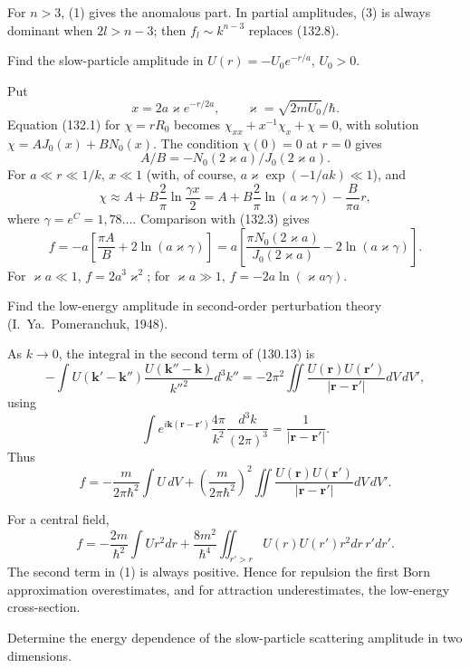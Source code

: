 For $n>3$, (1) gives the anomalous part. In partial amplitudes, (3) is always
dominant when $2l>n-3$; then $f_l\sim k^{n-3}$ replaces (132.8).

 Find the slow-particle amplitude in
$U(r)=-U_0e^{-r/a}$, $U_0>0$.

\SolutionHeading Put
\[
 x=2a\varkappa e^{-r/2a},\qquad \varkappa=\sqrt{2mU_0}/\hbar.
\]
Equation (132.1) for $\chi=rR_0$ becomes
$\chi_{xx}+x^{-1}\chi_x+\chi=0$, with solution
$\chi=AJ_0(x)+BN_0(x)$. The condition $\chi(0)=0$ at $r=0$ gives
\[
 A/B=-N_0(2\varkappa a)/J_0(2\varkappa a).
\]
For $a\ll r\ll1/k$, $x\ll1$ (with, of course,
$a\varkappa\exp(-1/ak)\ll1$), and
\[
 \chi\approx A+B\frac2\pi\ln\frac{\gamma x}2
 =A+B\frac2\pi\ln(a\varkappa\gamma)-\frac B{\pi a}r,
\]
where $\gamma=e^C=1{,}78\ldots$. Comparison with (132.3) gives
\[
 f=-a\left[\frac{\pi A}{B}+2\ln(a\varkappa\gamma)\right]
 =a\left[\frac{\pi N_0(2\varkappa a)}{J_0(2\varkappa a)}
 -2\ln(a\varkappa\gamma)\right].
\]
For $\varkappa a\ll1$, $f=2a^3\varkappa^2$; for
$\varkappa a\gg1$, $f=-2a\ln(\varkappa a\gamma)$.

 Find the low-energy amplitude in second-order perturbation
theory (I.~Ya.~Pomeranchuk, 1948).

\SolutionHeading As $k\to0$, the integral in the second term of (130.13) is
\[
 -\int U(\mathbf k'-\mathbf k'')\frac{U(\mathbf k''-\mathbf k)}{k''^2}d^3k''
 =-2\pi^2\iint\frac{U(\mathbf r)U(\mathbf r')}{|\mathbf r-\mathbf r'|}dV\,dV',
\]
using
\[
 \int e^{i\mathbf k(\mathbf r-\mathbf r')}\frac{4\pi}{k^2}
 \frac{d^3k}{(2\pi)^3}=\frac1{|\mathbf r-\mathbf r'|}.
\]
Thus
\begin{equation}
 f=-\frac{m}{2\pi\hbar^2}\int U\,dV
 +\left(\frac{m}{2\pi\hbar^2}\right)^2
 \iint\frac{U(\mathbf r)U(\mathbf r')}{|\mathbf r-\mathbf r'|}dV\,dV'. \tag{1}
\end{equation}

For a central field,
\[
 f=-\frac{2m}{\hbar^2}\int Ur^2dr+\frac{8m^2}{\hbar^4}
 \iint_{r'>r}U(r)U(r')r^2dr\,r'dr'.
\]
The second term in (1) is always positive. Hence for repulsion the first Born
approximation overestimates, and for attraction underestimates, the
low-energy cross-section.

 Determine the energy dependence of the slow-particle
scattering amplitude in two dimensions.

